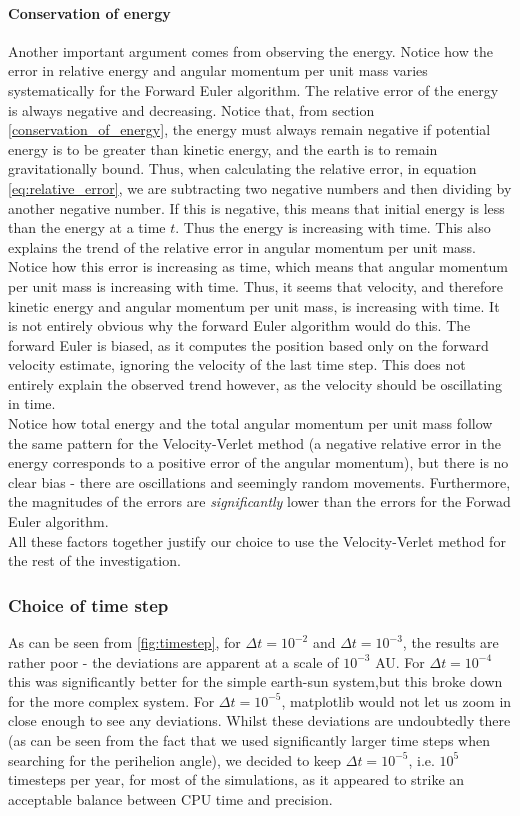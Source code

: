 \documentclass[a4paper, 10pt]{article}
\begin{document}
\paragraph{Conservation of energy} 
Another important argument comes from observing the energy. Notice how the error in relative energy and angular momentum per unit mass varies systematically for the Forward Euler algorithm. The relative error of the energy is always negative and decreasing. Notice that, from section \ref{conservation_of_energy}, the energy must always remain negative if potential energy is to be greater than kinetic energy, and the earth is to remain gravitationally bound. Thus, when calculating the relative error, in equation \ref{eq:relative_error}, we are subtracting two negative numbers and then dividing by another negative number. If this is negative, this means that initial energy is less than the energy at a time $t$. Thus the energy is increasing with time. This also explains the trend of the relative error in angular momentum per unit mass. Notice how this error is increasing as time, which means that angular momentum per unit mass is increasing with time. Thus, it seems that velocity, and therefore kinetic energy and angular momentum per unit mass,  is increasing with time. It is not entirely obvious why the forward Euler algorithm would do this. The forward Euler is biased, as it computes the position based only on the forward velocity estimate, ignoring the velocity of the last time step. This does not entirely explain the observed trend however, as the velocity should be oscillating in time.\\
\linebreak
Notice how total energy and the total angular momentum per unit mass follow the same pattern for the Velocity-Verlet method (a negative relative error in the energy corresponds to a positive error of the angular momentum), but there is no clear bias - there are oscillations and seemingly random movements. Furthermore, the magnitudes of the errors are \textit{significantly} lower than the errors for the Forwad Euler algorithm.\\
\linebreak
\linebreak
All these factors together justify our choice to use the Velocity-Verlet method for the rest of the investigation.
\subsubsection{Choice of time step}
As can be seen from \cref{fig:timestep}, for $\Delta t=10^{-2}$ and $\Delta t= 10^{-3}$, the results are rather poor - the deviations are apparent at a scale of $10^{-3}$ AU. For $\Delta t= 10^{-4}$ this was significantly better for the simple earth-sun system,but this broke down for the more complex system. For $\Delta t = 10^{-5}$, matplotlib would not let us zoom in close enough to see any deviations. Whilst these deviations are undoubtedly there (as can be seen from the fact that we used significantly larger time steps when searching for the perihelion angle), we decided to keep $\Delta t = 10^{-5}$, i.e. $10^5$ timesteps per year, for most of the simulations, as it appeared to strike an acceptable balance between CPU time and precision.
\end{document}
